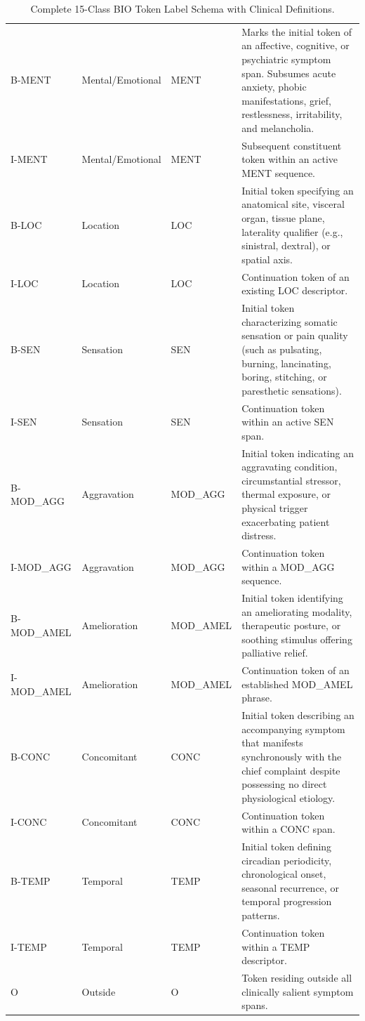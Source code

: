 \scriptsize
\begin{longtable}{P{2.2cm}P{2.6cm}P{2.4cm}P{7.2cm}}
\caption[Complete BIO Label Schema]{Complete 15-Class BIO Token Label Schema with Clinical Definitions.}\label{tab:fullschema}\\
\toprule
{} &  &  &  \\
\midrule
B-MENT & Mental/Emotional & MENT & Marks the initial token of an affective, cognitive, or psychiatric symptom span. Subsumes acute anxiety, phobic manifestations, grief, restlessness, irritability, and melancholia. \\
I-MENT & Mental/Emotional & MENT & Subsequent constituent token within an active MENT sequence. \\
\midrule
B-LOC & Location & LOC & Initial token specifying an anatomical site, visceral organ, tissue plane, laterality qualifier (e.g., sinistral, dextral), or spatial axis. \\
I-LOC & Location & LOC & Continuation token of an existing LOC descriptor. \\
\midrule
B-SEN & Sensation & SEN & Initial token characterizing somatic sensation or pain quality (such as pulsating, burning, lancinating, boring, stitching, or paresthetic sensations). \\
I-SEN & Sensation & SEN & Continuation token within an active SEN span. \\
\midrule
B-MOD\_\allowbreak AGG & Aggravation & MOD\_\allowbreak AGG & Initial token indicating an aggravating condition, circumstantial stressor, thermal exposure, or physical trigger exacerbating patient distress. \\
I-MOD\_\allowbreak AGG & Aggravation & MOD\_\allowbreak AGG & Continuation token within a MOD\_\allowbreak AGG sequence. \\
\midrule
B-MOD\_\allowbreak AMEL & Amelioration & MOD\_\allowbreak AMEL & Initial token identifying an ameliorating modality, therapeutic posture, or soothing stimulus offering palliative relief. \\
I-MOD\_\allowbreak AMEL & Amelioration & MOD\_\allowbreak AMEL & Continuation token of an established MOD\_\allowbreak AMEL phrase. \\
\midrule
B-CONC & Concomitant & CONC & Initial token describing an accompanying symptom that manifests synchronously with the chief complaint despite possessing no direct physiological etiology. \\
I-CONC & Concomitant & CONC & Continuation token within a CONC span. \\
\midrule
B-TEMP & Temporal & TEMP & Initial token defining circadian periodicity, chronological onset, seasonal recurrence, or temporal progression patterns. \\
I-TEMP & Temporal & TEMP & Continuation token within a TEMP descriptor. \\
\midrule
O & Outside & O & Token residing outside all clinically salient symptom spans. \\
\bottomrule
\end{longtable}
\normalsize


